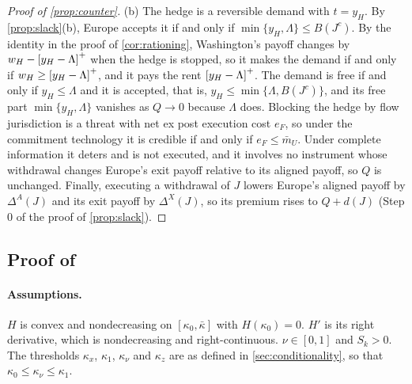 \begin{proof}[Proof of \cref{prop:counter}]
(b) The hedge is a reversible demand with $t=y_H$. By \cref{prop:slack}(b), Europe accepts it if and only if $\min\{y_H,\Lambda\}\le B(J^c)$. By the identity in the proof of \cref{cor:rationing}, Washington's payoff changes by $w_H-\left[y_H-\Lambda\right]^{+}$ when the hedge is stopped, so it makes the demand if and only if $w_H\ge\left[y_H-\Lambda\right]^{+}$, and it pays the rent $\left[y_H-\Lambda\right]^{+}$. The demand is free if and only if $y_H\le\Lambda$ and it is accepted, that is, $y_H\le\min\{\Lambda,B(J^c)\}$, and its free part $\min\{y_H,\Lambda\}$ vanishes as $Q\to 0$ because $\Lambda$ does. Blocking the hedge by flow jurisdiction is a threat with net ex post execution cost $e_F$, so under the commitment technology it is credible if and only if $e_F\le\bar m_U$. Under complete information it deters and is not executed, and it involves no instrument whose withdrawal changes Europe's exit payoff relative to its aligned payoff, so $Q$ is unchanged. Finally, executing a withdrawal of $J$ lowers Europe's aligned payoff by $\Delta^A(J)$ and its exit payoff by $\Delta^X(J)$, so its premium rises to $Q+d(J)$ (Step 0 of the proof of \cref{prop:slack}).
\end{proof}

\subsection{Proof of \texorpdfstring{}{conditionality as the price of concessions}}

\paragraph{Assumptions.} $H$ is convex and nondecreasing on $[\kappa_0,\bar\kappa]$ with $H(\kappa_0)=0$. $H'$ is its right derivative, which is nondecreasing and right-continuous. $\nu\in[0,1]$ and $S_k>0$. The thresholds $\kappa_x$, $\kappa_1$, $\kappa_\nu$ and $\kappa_z$ are as defined in \cref{sec:conditionality}, so that $\kappa_0\le\kappa_\nu\le\kappa_1$.

